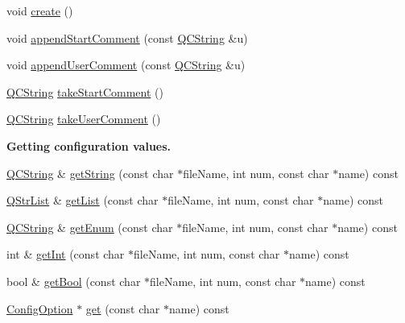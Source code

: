 \begin{DoxyCompactItemize}
void \mbox{\hyperlink{class_config_impl_a0e1887e271fe89b5f3e2154e344ad4b1}{create}} ()
\item 
void \mbox{\hyperlink{class_config_impl_a7a016d2f1ef3643494fb1b1e3201e928}{append\+Start\+Comment}} (const \mbox{\hyperlink{class_q_c_string}{Q\+C\+String}} \&u)
\item 
void \mbox{\hyperlink{class_config_impl_a33e3594e6a4848cd7803990e15b452de}{append\+User\+Comment}} (const \mbox{\hyperlink{class_q_c_string}{Q\+C\+String}} \&u)
\item 
\mbox{\hyperlink{class_q_c_string}{Q\+C\+String}} \mbox{\hyperlink{class_config_impl_a6e909c1b38e02a4536e16a33790ddca0}{take\+Start\+Comment}} ()
\item 
\mbox{\hyperlink{class_q_c_string}{Q\+C\+String}} \mbox{\hyperlink{class_config_impl_a998060bb7c8a5948956b7ccf192d62da}{take\+User\+Comment}} ()
\end{DoxyCompactItemize}
\begin{Indent}\textbf{ Getting configuration values.}\par
\begin{DoxyCompactItemize}
\item 
\mbox{\hyperlink{class_q_c_string}{Q\+C\+String}} \& \mbox{\hyperlink{class_config_impl_afb11a49a6e7c717d0242fedf10a36309}{get\+String}} (const char $\ast$file\+Name, int num, const char $\ast$name) const
\item 
\mbox{\hyperlink{class_q_str_list}{Q\+Str\+List}} \& \mbox{\hyperlink{class_config_impl_aa4ec3b5c98e5c889150a68c028d1152c}{get\+List}} (const char $\ast$file\+Name, int num, const char $\ast$name) const
\item 
\mbox{\hyperlink{class_q_c_string}{Q\+C\+String}} \& \mbox{\hyperlink{class_config_impl_a5c8800850fd2447c50f320ffb4ee0357}{get\+Enum}} (const char $\ast$file\+Name, int num, const char $\ast$name) const
\item 
int \& \mbox{\hyperlink{class_config_impl_adb74a4b0533fcb0452aa355bc0f931b6}{get\+Int}} (const char $\ast$file\+Name, int num, const char $\ast$name) const
\item 
bool \& \mbox{\hyperlink{class_config_impl_ad598f15be45d231f792b68314f7b0468}{get\+Bool}} (const char $\ast$file\+Name, int num, const char $\ast$name) const
\item 
\mbox{\hyperlink{class_config_option}{Config\+Option}} $\ast$ \mbox{\hyperlink{class_config_impl_af98aea170483825616a3d8888957f3e4}{get}} (const char $\ast$name) const
\end{DoxyCompactItemize}
\end{Indent}
